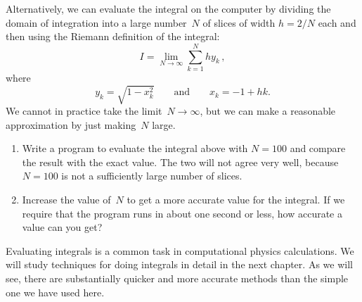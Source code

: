\documentclass[12pt]{article}
\begin{document}
\begin{exercises}
Alternatively, we can evaluate the integral on the computer by dividing the
domain of integration into a large number~$N$ of slices of width $h=2/N$
each and then using the Riemann definition of the integral:
\begin{displaymath}
I = \lim_{N\to\infty} \sum_{k=1}^N hy_k\,,
\end{displaymath}
where
\begin{displaymath}
y_k = \sqrt{1 - x_k^2}\qquad\mbox{and}\qquad
x_k = -1 + hk.
\end{displaymath}
We cannot in practice take the limit~$N\to\infty$, but we can make a
reasonable approximation by just making~$N$ large.
\begin{enumerate}
\item Write a program to evaluate the integral above with $N=100$ and
  compare the result with the exact value.  The two will not agree very
  well, because $N=100$ is not a sufficiently large number of slices.
\item Increase the value of~$N$ to get a more accurate value for the
  integral.  If we require that the program runs in about one second or
  less, how accurate a value can you get?
\end{enumerate}
Evaluating integrals is a common task in computational physics
calculations.  We will study techniques for doing integrals in detail in
the next chapter.  As we will see, there are substantially quicker and more
accurate methods than the simple one we have used here.

\end{exercises}
\end{document}
